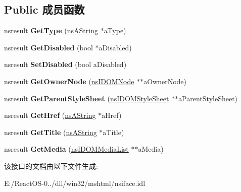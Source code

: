 \subsection*{Public 成员函数}
\begin{DoxyCompactItemize}
\item 
\mbox{\label{interfacens_i_d_o_m_style_sheet_afaa96e9c54e3fc13f6b3964d4fbf3b60}} 
nsresult {\bfseries Get\+Type} (\hyperlink{structns_string_container}{ns\+A\+String} $\ast$a\+Type)
\item 
\mbox{\label{interfacens_i_d_o_m_style_sheet_abb99b662ce8de143447017f41828501a}} 
nsresult {\bfseries Get\+Disabled} (bool $\ast$a\+Disabled)
\item 
\mbox{\label{interfacens_i_d_o_m_style_sheet_a186ecb33aec7f04b0a2c704e6af0cd07}} 
nsresult {\bfseries Set\+Disabled} (bool a\+Disabled)
\item 
\mbox{\label{interfacens_i_d_o_m_style_sheet_a9df04e5ccf33ed5b5c8ff22f76333669}} 
nsresult {\bfseries Get\+Owner\+Node} (\hyperlink{interfacens_i_d_o_m_node}{ns\+I\+D\+O\+M\+Node} $\ast$$\ast$a\+Owner\+Node)
\item 
\mbox{\label{interfacens_i_d_o_m_style_sheet_aacb77b613cb03635b5f84a29b573439f}} 
nsresult {\bfseries Get\+Parent\+Style\+Sheet} (\hyperlink{interfacens_i_d_o_m_style_sheet}{ns\+I\+D\+O\+M\+Style\+Sheet} $\ast$$\ast$a\+Parent\+Style\+Sheet)
\item 
\mbox{\label{interfacens_i_d_o_m_style_sheet_acdda7c965fb40d1612d4717a60c92c0f}} 
nsresult {\bfseries Get\+Href} (\hyperlink{structns_string_container}{ns\+A\+String} $\ast$a\+Href)
\item 
\mbox{\label{interfacens_i_d_o_m_style_sheet_afe9f5958c6a2c138d5428d18cd658b22}} 
nsresult {\bfseries Get\+Title} (\hyperlink{structns_string_container}{ns\+A\+String} $\ast$a\+Title)
\item 
\mbox{\label{interfacens_i_d_o_m_style_sheet_af2bb6aadfd3e7052e496f29df8c4d9a2}} 
nsresult {\bfseries Get\+Media} (\hyperlink{interfacens_i_supports}{ns\+I\+D\+O\+M\+Media\+List} $\ast$$\ast$a\+Media)
\end{DoxyCompactItemize}


该接口的文档由以下文件生成\+:\begin{DoxyCompactItemize}
\item 
E\+:/\+React\+O\+S-\/0../dll/win32/mshtml/nsiface.\+idl\end{DoxyCompactItemize}
